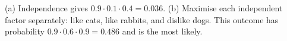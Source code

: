 (a) Independence gives $0.9\cdot0.1\cdot0.4=\boxed{0.036}$. (b) Maximise each independent factor separately: like cats, like rabbits, and dislike dogs. This outcome has probability $0.9\cdot0.6\cdot0.9=\boxed{0.486}$ and is the most likely.
